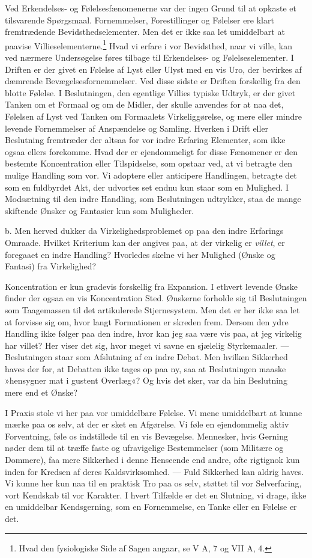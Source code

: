 \documentclass[12pt,a4paper,openany]{book}
\newcommand{\opage}[1]{\marginnote{\footnotesize\textit{[#1]}}}
\begin{document}
Ved Erkendelses- og Følelsesfænomenerne var der ingen Grund til at
opkaste et tilsvarende Spørgsmaal. Fornemmelser, Forestillinger og
Følelser ere klart fremtrædende Bevidsthedselementer. Men det er ikke
saa let umiddelbart at paavise Villieselementerne.\footnote[1]{Hvad den
fysiologiske Side af Sagen angaar, se V A, 7 og VII A, 4.} Hvad vi
erfare i vor Bevidsthed, naar vi ville, kan ved nærmere Undersøgelse
føres tilbage til Erkendelses- og Følelseselementer. I Driften er der
givet en Følelse af Lyst eller Ulyst med en vis Uro, der bevirkes af
dæmrende Bevægelsesfornemmelser. Ved disse sidste er Driften forskellig
fra den blotte Følelse. I Beslutningen, den egentlige Villies typiske
Udtryk, er der givet Tanken om et Formaal og om de Midler, der skulle
anvendes for at naa det, Følelsen af Lyst ved Tanken om Formaalets
Virkeliggørelse, og mere eller mindre levende Fornemmelser af
Anspændelse og Samling. Hverken i Drift eller Beslutning fremtræder der
altsaa for vor indre Erfaring Elementer, som ikke ogsaa ellers
forekomme. Hvad der er ejendommeligt for disse Fænomener er den bestemte
Koncentration eller Tilspidselse, som opstaar ved, at vi betragte den
mulige Handling som vor. Vi adoptere eller anticipere Handlingen,
betragte det som en fuldbyrdet Akt, der udvortes set endnu kun staar som
en Mulighed. I Modsætning til den indre Handling, som Beslutningen
udtrykker, staa de mange skiftende Ønsker og Fantasier kun som
Muligheder.


\opage{396}b. Men herved dukker da Virkelighedsproblemet op paa den
indre Erfarings Omraade. Hvilket Kriterium kan der angives paa, at der
virkelig er \emph{villet}, er foregaaet en indre Handling? Hvorledes
skelne vi her Mulighed (Ønske og Fantasi) fra Virkelighed?

Koncentration er kun gradevis forskellig fra Expansion. I ethvert
levende Ønske finder der ogsaa en vis Koncentration Sted. Ønskerne
forholde sig til Beslutningen som Taagemassen til det artikulerede
Stjernesystem. Men det er her ikke saa let at forvisse sig om, hvor
langt Formationen er skreden frem. Dersom den ydre Handling ikke følger
paa den indre, hvor kan jeg saa være vis paa, at jeg virkelig har
villet? Her viser det sig, hvor meget vi savne en sjælelig Styrkemaaler.
--- Beslutningen staar som Afslutning af en indre Debat. Men hvilken
Sikkerhed haves der for, at Debatten ikke tages op paa ny, saa at
Beslutningen maaske »hensygner mat i gustent Overlæg«? Og hvis det sker,
var da hin Beslutning mere end et Ønske?

I Praxis stole vi her paa vor umiddelbare Følelse. Vi mene umiddelbart
at kunne mærke paa os selv, at der er sket en Afgørelse. Vi føle en
ejendommelig aktiv Forventning, føle os indstillede til en vis
Bevægelse. Mennesker, hvis Gerning nøder dem til at træffe faste og
ufravigelige Bestemmelser (som Militære og Dommere), faa mere Sikkerhed
i denne Henseende end andre, ofte rigtignok kun inden for Kredsen af
deres Kaldsvirksomhed. --- Fuld Sikkerhed kan aldrig haves. Vi kunne her
kun naa til en praktisk Tro paa os selv, støttet til vor Selverfaring,
vort Kendskab til vor Karakter. I hvert Tilfælde er det en Slutning, vi
drage, ikke en umiddelbar Kendsgerning, som en Fornemmelse, en Tanke
eller en Følelse er det.
\end{document}
